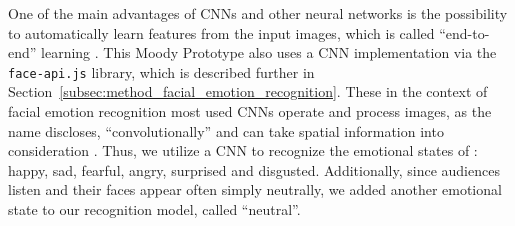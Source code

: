 One of the main advantages of CNNs and other neural networks is the possibility to automatically learn features from the input images, which is called ``end-to-end'' learning \cite{ko_brief_2018}. This Moody Prototype also uses a CNN implementation via the \texttt{face-api.js} library, which is described further in Section~\ref{subsec:method_facial_emotion_recognition}. These in the context of facial emotion recognition most used CNNs operate and process images, as the name discloses, ``convolutionally'' and can take spatial information into consideration \cite{ko_brief_2018, rosler_reducing_2021}. Thus, we utilize a CNN to recognize the emotional states of : happy, sad, fearful, angry, surprised and disgusted. Additionally, since audiences listen and their faces appear often simply neutrally, we added another emotional state to our recognition model, called ``neutral''.
